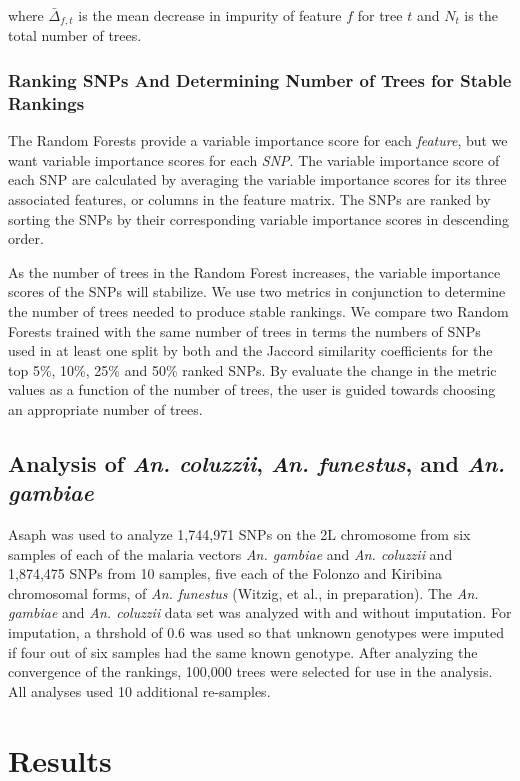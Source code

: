 where $\bar{\Delta}_{f, t}$ is the mean decrease in impurity of feature $f$ for tree $t$ and $N_t$ is the total number of trees.

\subsubsection{Ranking SNPs And Determining Number of Trees for Stable Rankings}
The Random Forests provide a variable importance score for each \emph{feature}, but we want variable importance scores for each \emph{SNP}. The variable importance score of each SNP are calculated by averaging the variable importance scores for its three associated features, or columns in the feature matrix.  The SNPs are ranked by sorting the SNPs by their corresponding variable importance scores in descending order.  

As the number of trees in the Random Forest increases, the variable importance scores of the SNPs will stabilize.  We use two metrics in conjunction to determine the number of trees needed to produce stable rankings. We compare two Random Forests trained with the same number of trees in terms the numbers of SNPs used in at least one split by both and the Jaccord similarity coefficients for the top 5\%, 10\%, 25\% and 50\% ranked SNPs.  By evaluate the change in the metric values as a function of the number of trees, the user is guided towards choosing an appropriate number of trees.

\subsection{Analysis of \emph{An. coluzzii}, \emph{An. funestus}, and \emph{An. gambiae}}
Asaph was used to analyze 1,744,971 SNPs on the 2L chromosome from six samples of each of the malaria vectors \emph{An. gambiae} and \emph{An. coluzzii} \cite{Fontaine2015} and 1,874,475 SNPs from 10 samples, five each of the Folonzo and Kiribina chromosomal forms, of \emph{An. funestus} (Witzig, et al., in preparation). The \emph{An. gambiae} and \emph{An. coluzzii} data set was analyzed with and without imputation. For imputation, a thrshold of 0.6 was used so that unknown genotypes were imputed if four out of six samples had the same known genotype.  After analyzing the convergence of the rankings, 100,000 trees were selected for use in the analysis.  All analyses used 10 additional re-samples.

\section{Results}

